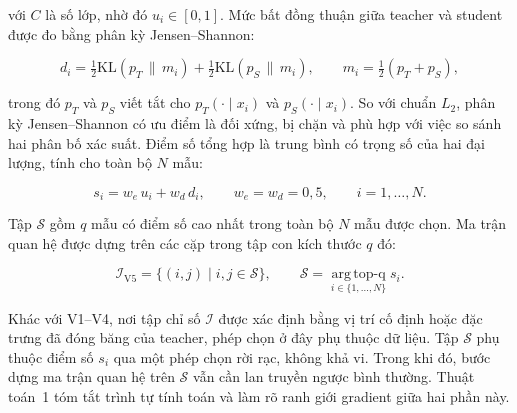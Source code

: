 với $C$ là số lớp, nhờ đó $u_i \in [0,1]$. Mức bất đồng thuận giữa teacher và
student được đo bằng phân kỳ Jensen--Shannon:

\begin{equation}
\label{eq:js}
d_i = \tfrac{1}{2}\mathrm{KL}\!\left(p_T \,\|\, m_i\right)
    + \tfrac{1}{2}\mathrm{KL}\!\left(p_S \,\|\, m_i\right),
\qquad m_i = \tfrac{1}{2}\left(p_T + p_S\right),
\end{equation}

trong đó $p_T$ và $p_S$ viết tắt cho $p_T(\cdot \mid x_i)$ và
$p_S(\cdot \mid x_i)$. So với chuẩn $L_2$, phân kỳ Jensen--Shannon có ưu điểm
là đối xứng, bị chặn và phù hợp với việc so sánh hai phân bố xác suất. Điểm
số tổng hợp là trung bình có trọng số của hai đại lượng, tính cho toàn bộ $N$
mẫu:

\begin{equation}
\label{eq:score}
s_i = w_e\,u_i + w_d\,d_i, \qquad w_e = w_d = 0{,}5,
\qquad i = 1,\ldots,N.
\end{equation}

Tập $\mathcal{S}$ gồm $q$ mẫu có điểm số cao nhất trong toàn bộ $N$ mẫu
được chọn. Ma trận quan hệ được dựng trên các cặp trong tập con kích thước
$q$ đó:

\begin{equation}
\label{eq:i-v5}
\mathcal{I}_{\mathrm{V5}} = \{(i,j) \mid i,j \in \mathcal{S}\},
\qquad \mathcal{S} = \operatorname*{arg\,top\text{-}q}_{i \in \{1,\ldots,N\}} s_i.
\end{equation}

Khác với V1--V4, nơi tập chỉ số $\mathcal{I}$ được xác định bằng vị trí cố
định hoặc đặc trưng đã đóng băng của teacher, phép chọn ở đây phụ thuộc dữ liệu. Tập $\mathcal{S}$ phụ thuộc điểm số $s_i$ qua một phép chọn rời rạc, không khả vi.
Trong khi đó, bước dựng ma trận quan hệ trên $\mathcal{S}$ vẫn cần lan
truyền ngược bình thường. Thuật toán~1 tóm tắt trình tự tính toán và làm rõ ranh
giới gradient giữa hai phần này.

